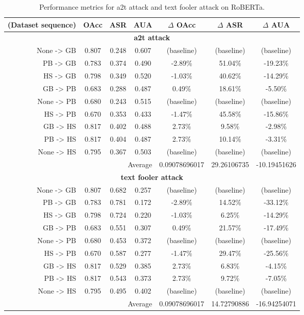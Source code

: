 \documentclass{article}
\begin{document}
\begin{table}[ht]
\centering
\caption{Performance metrics for a2t attack and text fooler attack on RoBERTa.}
\small
\begin{tabular}{r|ccc|ccc}
\hline
\textbf{(Dataset sequence)} & \textbf{OAcc} & \textbf{ASR} & \textbf{AUA} & \textbf{$\Delta$ OAcc} & \textbf{$\Delta$ ASR} & \textbf{$\Delta$ AUA} \\ \hline
\multicolumn{7}{c}{\textbf{a2t attack}} \\ \hline
None -> GB & 0.807 & 0.248 & 0.607 & (baseline) & (baseline) & (baseline) \\
PB -> GB & 0.783 & 0.374 & 0.490 & -2.89\% & 51.04\% & -19.23\% \\
HS -> GB & 0.798 & 0.349 & 0.520 & -1.03\% & 40.62\% & -14.29\% \\
GB -> PB & 0.683 & 0.288 & 0.487 & 0.49\% & 18.61\% & -5.50\% \\
None -> PB & 0.680 & 0.243 & 0.515 & (baseline) & (baseline) & (baseline) \\
HS -> PB & 0.670 & 0.353 & 0.433 & -1.47\% & 45.58\% & -15.86\% \\
GB -> HS & 0.817 & 0.402 & 0.488 & 2.73\% & 9.58\% & -2.98\% \\
PB -> HS & 0.817 & 0.404 & 0.487 & 2.73\% & 10.14\% & -3.31\% \\
None -> HS & 0.795 & 0.367 & 0.503 & (baseline) & (baseline) & (baseline) \\ \hline
\multicolumn{4}{r|}{Average} & 0.09078696017 & 29.26106735 & -10.19451626 \\ \hline
\multicolumn{7}{c}{\textbf{text fooler attack}} \\ \hline
None -> GB & 0.807 & 0.682 & 0.257 & (baseline) & (baseline) & (baseline) \\
PB -> GB & 0.783 & 0.781 & 0.172 & -2.89\% & 14.52\% & -33.12\% \\
HS -> GB & 0.798 & 0.724 & 0.220 & -1.03\% & 6.25\% & -14.29\% \\
GB -> PB & 0.683 & 0.551 & 0.307 & 0.49\% & 21.57\% & -17.49\% \\
None -> PB & 0.680 & 0.453 & 0.372 & (baseline) & (baseline) & (baseline) \\
HS -> PB & 0.670 & 0.587 & 0.277 & -1.47\% & 29.47\% & -25.56\% \\
GB -> HS & 0.817 & 0.529 & 0.385 & 2.73\% & 6.83\% & -4.15\% \\
PB -> HS & 0.817 & 0.543 & 0.373 & 2.73\% & 9.72\% & -7.05\% \\
None -> HS & 0.795 & 0.495 & 0.402 & (baseline) & (baseline) & (baseline) \\ \hline
\multicolumn{4}{r|}{Average} & 0.09078696017 & 14.72790886 & -16.94254071 \\ \hline
\end{tabular}
\label{table:roberta_attack_comparison}
\end{table}
\end{document}
